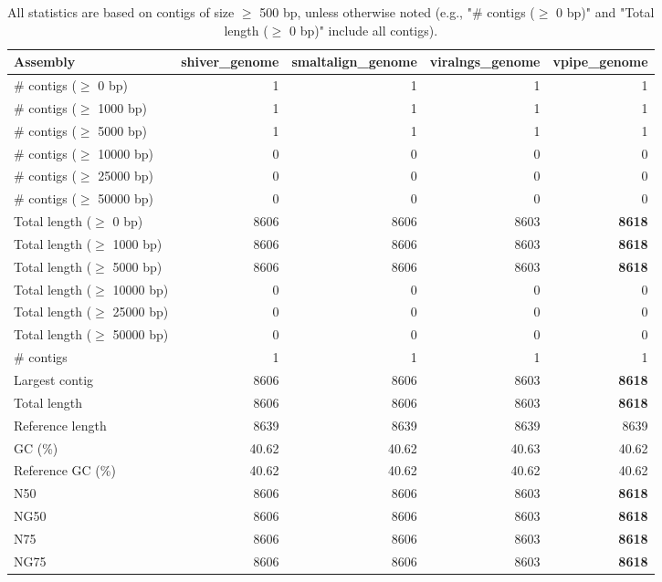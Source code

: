 \documentclass[12pt,a4paper]{article}
\begin{document}
\begin{table}[ht]
\begin{center}
\caption{All statistics are based on contigs of size $\geq$ 500 bp, unless otherwise noted (e.g., "\# contigs ($\geq$ 0 bp)" and "Total length ($\geq$ 0 bp)" include all contigs).}
\begin{tabular}{|l*{4}{|r}|}
\hline
Assembly & shiver\_genome & smaltalign\_genome & viralngs\_genome & vpipe\_genome \\ \hline
\# contigs ($\geq$ 0 bp) & 1 & 1 & 1 & 1 \\ \hline
\# contigs ($\geq$ 1000 bp) & 1 & 1 & 1 & 1 \\ \hline
\# contigs ($\geq$ 5000 bp) & 1 & 1 & 1 & 1 \\ \hline
\# contigs ($\geq$ 10000 bp) & 0 & 0 & 0 & 0 \\ \hline
\# contigs ($\geq$ 25000 bp) & 0 & 0 & 0 & 0 \\ \hline
\# contigs ($\geq$ 50000 bp) & 0 & 0 & 0 & 0 \\ \hline
Total length ($\geq$ 0 bp) & 8606 & 8606 & 8603 & {\bf 8618} \\ \hline
Total length ($\geq$ 1000 bp) & 8606 & 8606 & 8603 & {\bf 8618} \\ \hline
Total length ($\geq$ 5000 bp) & 8606 & 8606 & 8603 & {\bf 8618} \\ \hline
Total length ($\geq$ 10000 bp) & 0 & 0 & 0 & 0 \\ \hline
Total length ($\geq$ 25000 bp) & 0 & 0 & 0 & 0 \\ \hline
Total length ($\geq$ 50000 bp) & 0 & 0 & 0 & 0 \\ \hline
\# contigs & 1 & 1 & 1 & 1 \\ \hline
Largest contig & 8606 & 8606 & 8603 & {\bf 8618} \\ \hline
Total length & 8606 & 8606 & 8603 & {\bf 8618} \\ \hline
Reference length & 8639 & 8639 & 8639 & 8639 \\ \hline
GC (\%) & 40.62 & 40.62 & 40.63 & 40.62 \\ \hline
Reference GC (\%) & 40.62 & 40.62 & 40.62 & 40.62 \\ \hline
N50 & 8606 & 8606 & 8603 & {\bf 8618} \\ \hline
NG50 & 8606 & 8606 & 8603 & {\bf 8618} \\ \hline
N75 & 8606 & 8606 & 8603 & {\bf 8618} \\ \hline
NG75 & 8606 & 8606 & 8603 & {\bf 8618} \\ \hline

\end{tabular}
\end{center}
\end{table}
\end{document}
